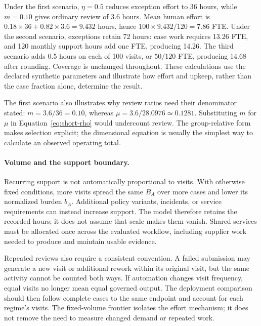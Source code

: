 Under the first scenario, $\eta=0.5$ reduces exception effort to 36 hours, while
$m=0.10$ gives ordinary review of 3.6 hours. Mean human effort is
$0.18\times36+0.82\times3.6=9.432$ hours, hence
$100\times9.432/120=7.86$ FTE. Under the second scenario, exceptions retain 72 hours:
case work requires 13.26 FTE, and 120 monthly support hours add one FTE, producing 14.26.
The third scenario adds 0.5 hours on each of 100 visits, or $50/120$ FTE, producing 14.68
after rounding. Coverage is unchanged throughout. These calculations use the declared
synthetic parameters and illustrate how effort and upkeep, rather than the case fraction
alone, determine the result.

The first scenario also illustrates why review ratios need their denominator stated:
$m=3.6/36=0.10$, whereas $\mu=3.6/28.0976\simeq0.1281$. Substituting $m$ for $\mu$ in
Equation~\eqref{eq:short-rho} would undercount review. The group-relative form makes
selection explicit; the dimensional equation is usually the simplest way to calculate
an observed operating total.

\paragraph{Volume and the support boundary.}
Recurring support is not automatically proportional to visits. With otherwise fixed
conditions, more visits spread the same $B_A$ over more cases and lower its normalized
burden $b_A$. Additional policy variants, incidents, or service requirements can instead
increase support. The model therefore retains the recorded hours; it does not assume that
scale makes them vanish. Shared services must be allocated once across the evaluated
workflow, including supplier work needed to produce and maintain usable evidence.

Repeated reviews also require a consistent convention. A failed submission may generate a
new visit or additional rework within its original visit, but the same activity cannot be
counted both ways. If automation changes visit frequency, equal visits no longer mean equal
governed output. The deployment comparison should then follow complete cases to the same
endpoint and account for each regime's visits. The fixed-volume frontier isolates the
effort mechanism; it does not remove the need to measure changed demand or repeated work.



